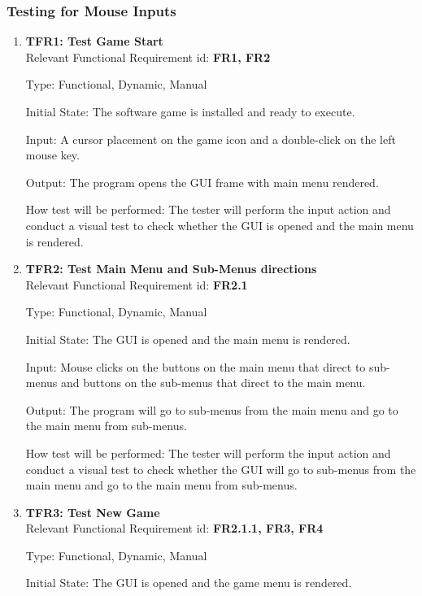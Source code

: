 \documentclass[12pt, titlepage]{article}
\begin{document}
\subsubsection{Testing for Mouse Inputs}

\begin{enumerate}





\item{\textbf{TFR1: Test Game Start}\\}
Relevant Functional Requirement id: \textbf{FR1, FR2}

Type: Functional, Dynamic, Manual

Initial State: The software game is installed and ready to execute.

Input: A cursor placement on the game icon and a double-click on the left mouse key.

Output: The program opens the GUI frame with main menu rendered.

How test will be performed: The tester will perform the input action and conduct a visual test to check whether the GUI is opened and the main menu is rendered.


\item{\textbf{TFR2: Test Main Menu and Sub-Menus directions}\\}
Relevant Functional Requirement id: \textbf{FR2.1}

Type: Functional, Dynamic, Manual

Initial State: The GUI is opened and the main menu is rendered.

Input: Mouse clicks on the buttons on the main menu that direct to sub-menus and buttons on the sub-menus that direct to the main menu.

Output: The program will go to sub-menus from the main menu and go to the main menu from sub-menus.

How test will be performed: The tester will perform the input action and conduct a visual test to check whether the GUI will go to sub-menus from the main menu and go to the main menu from sub-menus.

\item{\textbf{TFR3: Test New Game}\\}
Relevant Functional Requirement id: \textbf{FR2.1.1, FR3, FR4}

Type: Functional, Dynamic, Manual

Initial State: The GUI is opened and the game menu is rendered.


\end{enumerate}
\end{document}
